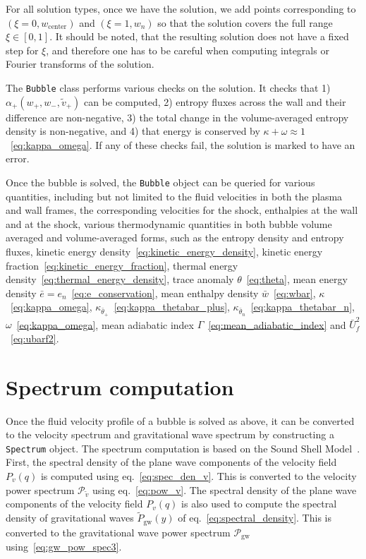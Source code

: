 For all solution types, once we have the solution,
we add points corresponding to $(\xi=0, w_\text{center})$ and $(\xi=1, w_n)$
so that the solution covers the full range $\xi \in [0, 1]$.
It should be noted, that the resulting solution does not have a fixed step for $\xi$,
and therefore one has to be careful when computing integrals or Fourier transforms of the solution.

The \verb|Bubble| class performs various checks on the solution.
It checks that
1) $\alpha_+(w_+, w_-, \tilde{v}_+)$ can be computed,
2) entropy fluxes across the wall and their difference are non-negative,
3) the total change in the volume-averaged entropy density is non-negative, and
4) that energy is conserved by $\kappa + \omega \approx 1$~\eqref{eq:kappa_omega}.
If any of these checks fail, the solution is marked to have an error.

Once the bubble is solved, the \verb|Bubble| object can be queried for various quantities,
including but not limited to the fluid velocities in both the plasma and wall frames,
the corresponding velocities for the shock,
enthalpies at the wall and at the shock,
various thermodynamic quantities in both bubble volume averaged and volume-averaged forms,
such as the entropy density and entropy fluxes,
kinetic energy density~\eqref{eq:kinetic_energy_density},
kinetic energy fraction~\eqref{eq:kinetic_energy_fraction},
thermal energy density~\eqref{eq:thermal_energy_density},
trace anomaly $\theta$~\eqref{eq:theta},
mean energy density $\bar{e} = e_n$~\eqref{eq:e_conservation},
mean enthalpy density $\bar{w}$~\eqref{eq:wbar},
$\kappa$~\eqref{eq:kappa_omega},
$\kappa_{\bar{\theta}_+}$~\eqref{eq:kappa_thetabar_plus},
$\kappa_{\bar{\theta}_n}$~\eqref{eq:kappa_thetabar_n},
$\omega$~\eqref{eq:kappa_omega},
mean adiabatic index $\Gamma$~\eqref{eq:mean_adiabatic_index} and
$\bar{U}_f^2$~\eqref{eq:ubarf2}.


\section{Spectrum computation}
Once the fluid velocity profile of a bubble is solved as above,
it can be converted to the velocity spectrum and gravitational wave spectrum by constructing a \verb|Spectrum| object.
The spectrum computation is based on the Sound Shell Model~\cite{hindmarsh_gw_pt_2019}.
First, the spectral density of the plane wave components of the velocity field $P_v(q)$ is computed using eq.~\eqref{eq:spec_den_v}.
This is converted to the velocity power spectrum $\mathcal{P}_{\tilde{v}}$ using eq.~\eqref{eq:pow_v}.
The spectral density of the plane wave components of the velocity field $P_v(q)$ is also used to compute the spectral density of gravitational waves $\tilde{P}_{\text{gw}}(y)$ of eq.~\eqref{eq:spectral_density}.
This is converted to the gravitational wave power spectrum $\mathcal{P}_{\text{gw}}$ using~\eqref{eq:gw_pow_spec3}.


